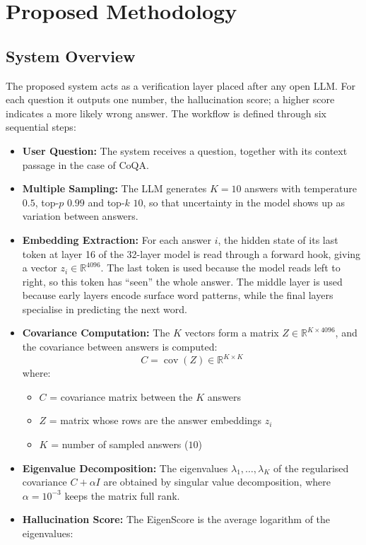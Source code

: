 \documentclass[journal]{IEEEtran}
\begin{document}
\section{Proposed Methodology}
\subsection{System Overview}
The proposed system acts as a verification layer placed after any open LLM. For each question it outputs one number, the hallucination score; a higher score indicates a more likely wrong answer. The workflow is defined through six sequential steps:
\begin{itemize}
\item \textbf{User Question:} The system receives a question, together with its context passage in the case of CoQA.
\item \textbf{Multiple Sampling:} The LLM generates $K=10$ answers with temperature $0.5$, top-$p$ $0.99$ and top-$k$ $10$, so that uncertainty in the model shows up as variation between answers.
\item \textbf{Embedding Extraction:} For each answer $i$, the hidden state of its last token at layer 16 of the 32-layer model is read through a forward hook, giving a vector $z_i\in\mathbb{R}^{4096}$. The last token is used because the model reads left to right, so this token has ``seen'' the whole answer. The middle layer is used because early layers encode surface word patterns, while the final layers specialise in predicting the next word.
\item \textbf{Covariance Computation:} The $K$ vectors form a matrix $Z\in\mathbb{R}^{K\times 4096}$, and the covariance between answers is computed:
\begin{equation}
C=\operatorname{cov}(Z)\in\mathbb{R}^{K\times K}
\end{equation}
where:
\begin{itemize}
\item[--] $C$ = covariance matrix between the $K$ answers
\item[--] $Z$ = matrix whose rows are the answer embeddings $z_i$
\item[--] $K$ = number of sampled answers ($10$)
\end{itemize}
\item \textbf{Eigenvalue Decomposition:} The eigenvalues $\lambda_1,\dots,\lambda_K$ of the regularised covariance $C+\alpha I$ are obtained by singular value decomposition, where $\alpha=10^{-3}$ keeps the matrix full rank.
\item \textbf{Hallucination Score:} The EigenScore is the average logarithm of the eigenvalues:

\end{itemize}
\end{document}
